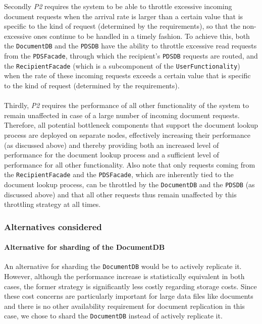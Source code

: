 \documentclass[a4paper,10pt]{article}
\begin{document}
Secondly \textit{P2} requires the system to be able to throttle excessive incoming document requests when the arrival rate is larger than a certain value that is specific to the kind of request (determined by the requirements), so that the non-excessive ones continue to be handled in a timely fashion. To achieve this, both the \texttt{DocumentDB} and the \texttt{PDSDB} have the ability to throttle excessive read requests from the \texttt{PDSFacade}, through which the recipient's \texttt{PDSDB} requests are routed, and the \texttt{RecipientFacade} (which is a subcomponent of the \texttt{UserFunctionality}) when the rate of these incoming requests exceeds a certain value that is specific to the kind of request (determined by the requirements).\\\\
Thirdly, \textit{P2} requires the performance of all other functionality of the system to remain unaffected in case of a large number of incoming document requests. Therefore, all potential bottleneck components that support the document lookup process are deployed on separate nodes, effectively increasing their performance (as discussed above) and thereby providing both an increased level of performance for the document lookup process and a sufficient level of performance for all other functionality. Also note that only requests coming from the \texttt{RecipientFacade} and the \texttt{PDSFacade}, which are inherently tied to the document lookup process, can be throttled by the \texttt{DocumentDB} and the \texttt{PDSDB} (as discussed above) and that all other requests thus remain unaffected by this throttling strategy at all times.
\subsubsection*{Alternatives considered}
\paragraph{Alternative for sharding of the DocumentDB}
An alternative for sharding the \texttt{DocumentDB} would be to actively replicate it. However, although the performance increase is statistically equivalent in both cases, the former strategy is significantly less costly regarding storage costs. Since these cost concerns are particularly important for large data files like documents and there is no other availability requirement for document replication in this case, we chose to shard the \texttt{DocumentDB} instead of actively replicate it.
\end{document}
